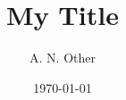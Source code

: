 \documentclass[preprint]{revtex4-1}
\begin{document}
\title{My Title}
\author{A. N. Other}
\date{\today}

\begin{titlepage}
\maketitle
\tableofcontents
\end{titlepage}



 

\newpage
\begin{appendices}

\end{appendices}
\end{document}
